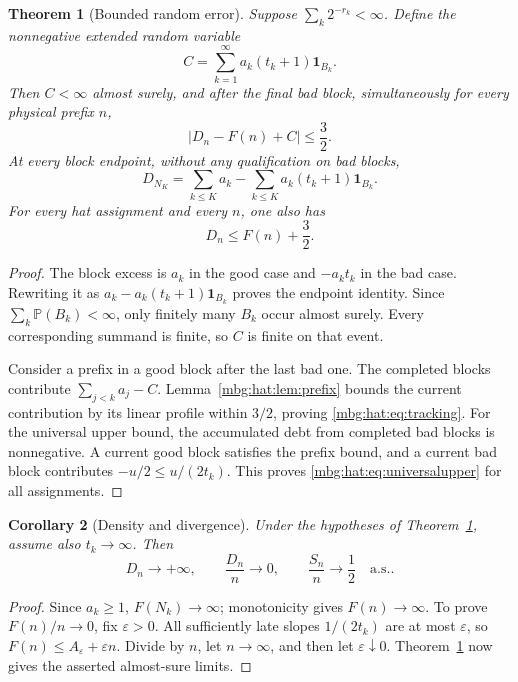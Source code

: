 \documentclass[11pt,letterpaper]{article}
\newtheorem{theorem}{Theorem}[section]
\newtheorem{corollary}[theorem]{Corollary}
\theoremstyle{definition}
\newcommand{\Prb}{\mathbb P}
\newcommand{\ind}{\mathbf 1}
\newcommand{\as}{\text{a.s.}}
\begin{document}
\begin{theorem}[Bounded random error]\label{mbg:hat:thm:tracking}
Suppose \(\sum_k2^{-r_k}<\infty\). Define the nonnegative extended
random variable
\[
  C=\sum_{k=1}^\infty a_k(t_k+1)\ind_{B_k}.                 \tag{22.2}\label{mbg:hat:eq:debt}
\]
Then \(C<\infty\) almost surely, and after the final bad block,
simultaneously for every physical prefix \(n\),
\[
  |D_n-F(n)+C|\le\frac32.                                \tag{22.3}\label{mbg:hat:eq:tracking}
\]
At every block endpoint, without any qualification on bad blocks,
\[
  D_{N_K}=\sum_{k\le K}a_k
          -\sum_{k\le K}a_k(t_k+1)\ind_{B_k}.             \tag{22.4}\label{mbg:hat:eq:debt-exact}
\]
For every hat assignment and every \(n\), one also has
\[
  D_n\le F(n)+\frac32.                                   \tag{22.5}\label{mbg:hat:eq:universalupper}
\]
\end{theorem}
\begin{proof}
The block excess is \(a_k\) in the good case and \(-a_kt_k\) in the
bad case. Rewriting it as
\(a_k-a_k(t_k+1)\ind_{B_k}\) proves the endpoint identity.
Since \(\sum_k\Prb(B_k)<\infty\), only finitely many \(B_k\) occur
almost surely. Every corresponding summand is finite, so \(C\) is
finite on that event.

Consider a prefix in a good block after the last bad one. The
completed blocks contribute \(\sum_{j<k}a_j-C\).
Lemma~\ref{mbg:hat:lem:prefix} bounds the current contribution by its linear
profile within \(3/2\), proving \eqref{mbg:hat:eq:tracking}. For the universal
upper bound, the accumulated debt from completed bad blocks is
nonnegative. A current good block satisfies the prefix bound, and a
current bad block contributes \(-u/2\le u/(2t_k)\). This proves
\eqref{mbg:hat:eq:universalupper} for all assignments.
\end{proof}

\begin{corollary}[Density and divergence]\label{mbg:hat:cor:density}
Under the hypotheses of Theorem~\ref{mbg:hat:thm:tracking}, assume also
\(t_k\to\infty\). Then
\[
  D_n\to+\infty,\qquad \frac{D_n}{n}\to0,\qquad
  \frac{S_n}{n}\to\frac12\quad\as.
\]
\end{corollary}
\begin{proof}
Since \(a_k\ge1\), \(F(N_k)\to\infty\); monotonicity gives
\(F(n)\to\infty\). To prove \(F(n)/n\to0\), fix \(\varepsilon>0\).
All sufficiently late slopes \(1/(2t_k)\) are at most
\(\varepsilon\), so \(F(n)\le A_\varepsilon+\varepsilon n\).
Divide by \(n\), let \(n\to\infty\), and then let
\(\varepsilon\downarrow0\). Theorem~\ref{mbg:hat:thm:tracking} now gives
the asserted almost-sure limits.
\end{proof}
\end{document}
